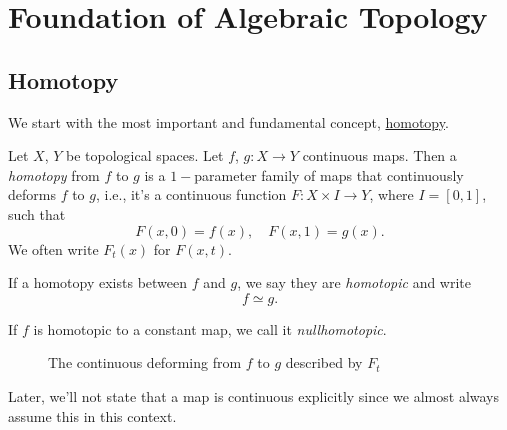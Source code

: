 \section{Foundation of Algebraic Topology}
\subsection{Homotopy}
We start with the most important and fundamental concept, \hyperref[def:homotopy]{homotopy}.
\begin{definition}\label{def:homotopy}\label{def:homotopic}\label{def:nullhomotopic}
	Let \(X\), \(Y\) be topological spaces. Let \(f\), \(g\colon X\to Y\) continuous maps. Then a \emph{homotopy} from \(f\)
	to \(g\) is a \(1-\)parameter family of maps that continuously deforms \(f\) to \(g\), i.e., it's a continuous function
	\(F\colon X\times I\to Y\), where \(I=\left[0,1\right]\), such that
	\[
		F(x, 0) = f(x),\quad F(x, 1) = g(x).
	\]
	We often write \(F_{t}(x)\) for \(F(x, t)\).

	\par If a homotopy exists between \(f\) and \(g\), we say they are \emph{homotopic} and write
	\[
		f\simeq g.
	\]

	\par If \(f\) is homotopic to a constant map, we call it \emph{nullhomotopic}.
\end{definition}
\begin{figure}[H]
	\centering
	\caption{The continuous deforming from \(f\) to \(g\) described by \(F_t\)}
	\label{fig:def:homotopy}
\end{figure}

\begin{remark}
	Later, we'll not state that a map is continuous explicitly since we almost always assume this in this context.
\end{remark}


